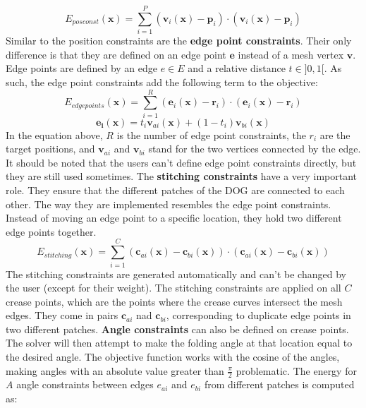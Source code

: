 \documentclass[a4paper,twoside,12pt,nochapterprefix]{scrbook}
\begin{document}
\begin{equation}
E_{posconst}(\mathbf{x}) = \sum_{i = 1}^P (\mathbf{v}_i(\mathbf{x}) - \mathbf{p}_i) \cdot (\mathbf{v}_i(\mathbf{x}) - \mathbf{p}_i)
\end{equation}
Similar to the position constraints are the \textbf{edge point constraints}. Their only difference is that they are defined on an edge point $\mathbf{e}$ instead of a mesh vertex $\mathbf{v}$. Edge points are defined by an edge $e \in E$ and a relative distance $t \in ]0,1[$. As such, the edge point constraints add the following term to the objective:
\begin{equation}
E_{edgepoints}(\mathbf{x}) = \sum_{i = 1}^R (\mathbf{e}_i(\mathbf{x}) - \mathbf{r}_i) \cdot (\mathbf{e}_i(\mathbf{x}) - \mathbf{r}_i)
\end{equation}
\begin{equation}
\mathbf{e_i}(\mathbf{x}) = t_i \mathbf{v}_{ai}(\mathbf{x}) + (1-t_i) \mathbf{v}_{bi}(\mathbf{x})
\end{equation}
In the equation above, $R$ is the number of edge point constraints, the $r_i$ are the target positions, and $\mathbf{v}_{ai}$ and $\mathbf{v}_{bi}$ stand for the two vertices connected by the edge. It should be noted that the users can't define edge point constraints directly, but they are still used sometimes.\newline
The \textbf{stitching constraints} have a very important role. They ensure that the different patches of the DOG are connected to each other. The way they are implemented resembles the edge point constraints. Instead of moving an edge point to a specific location, they hold two different edge points together.
\begin{equation}
E_{stitching}(\mathbf{x}) = \sum_{i = 1}^C (\mathbf{c}_{ai}(\mathbf{x}) - \mathbf{c}_{bi}(\mathbf{x})) \cdot (\mathbf{c}_{ai}(\mathbf{x}) - \mathbf{c}_{bi}(\mathbf{x}))
\end{equation}
The stitching constraints are generated automatically and can't be changed by the user (except for their weight). The stitching constraints are applied on all $C$ crease points, which are the points where the crease curves intersect the mesh edges. They come in pairs $\mathbf{c}_{ai}$ nad $\mathbf{c}_{bi}$, corresponding to duplicate edge points in two different patches.\newline
\textbf{Angle constraints} can also be defined on crease points. The solver will then attempt to make the folding angle at that location equal to the desired angle. The objective function works with the cosine of the angles, making angles with an absolute value greater than $\frac{\pi}{2}$ problematic. The energy for $A$ angle constraints between edges $e_{ai}$ and $e_{bi}$ from different patches is computed as:
\end{document}
